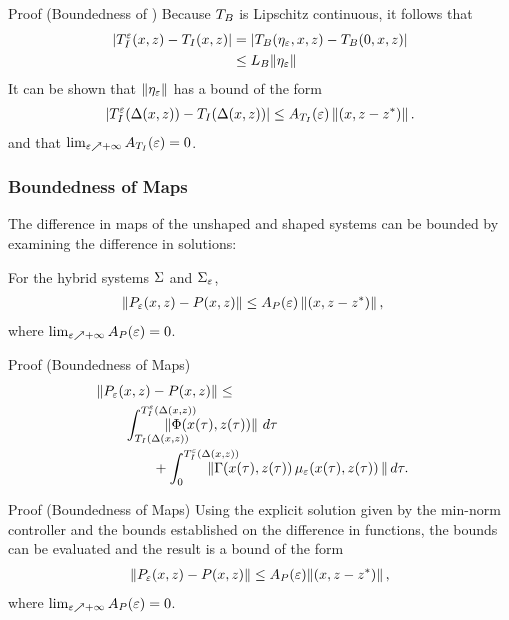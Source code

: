 \begin{frame}[t]
   {
    \begin{block}{Proof (Boundedness of \TtI{})}
      Because $T_{B}$ is Lipschitz continuous, it follows that
      \begin{align*}
        | T_{I}^{\varepsilon}(x, z) - T_{I}(x, z) | &= | T_{B}(\eta_{\varepsilon}, x, z) - T_{B}(0, x, z)|\\
        &\leq L_{B} \| \eta_{\varepsilon} \|
      \end{align*}
      It can be shown that $\| \eta_{\varepsilon} \|$ has a bound of the form
      \begin{align*}
        | T_{I}^{\varepsilon}(\Delta(x, z)) - T_{I}(\Delta(x, z)) | \leq A_{T_{I}}(\varepsilon) \left\|(x, z - z^{*})\right\|.
      \end{align*}
       and that $\lim_{\varepsilon \nearrow +\infty} A_{T_{I}}(\varepsilon) = 0$. \hfill \qedsymbol
    \end{block}
  }
\end{frame}

\begin{frame}[t]
  \frametitle{Boundedness of \Poincare{} Maps}
   {
    The difference in \Poincare{} maps of the unshaped and shaped systems can be
    bounded by examining the difference in solutions:
    \begin{lemma}
      For the hybrid systems $\Sigma$ and $\Sigma_{\varepsilon}$,
      \begin{eqnarray}
        \nonumber
        &\| P_{\varepsilon}(x, z) - P(x, z) \| \leq A_{P}(\varepsilon) \left\|(x, z - z^{*})\right\|,
      \end{eqnarray}
      where  $\lim_{\varepsilon \nearrow +\infty}A_{P}(\varepsilon) = 0$.
    \end{lemma}
  }

   {
    \begin{block}{Proof (Boundedness of \Poincare{} Maps)}
      \begin{align*}
        \lefteqn{\left\| \Pe\argsxz - \P\argsxz \right\| \leq}\\
        & \hspace{2em} \int_{\TIDelta}^{\TIeDelta} \hspace{-2.5em} \left\| \bigF\argsxztau \right\| \, d\tau\\
        & \hspace{4em} \mbox{} + \int_{0}^{\TIeDelta} \hspace{-2.5em} \left\| \bigG\argsxztau \, \mueps\argsxztau \, \right\| d\tau.
      \end{align*}
    \end{block}
  }

   {
    \begin{block}{Proof (Boundedness of \Poincare{} Maps)}
      Using the explicit solution given by the min-norm controller and the bounds
      established on the difference in \tti{} functions, the bounds can be
      evaluated and the result is a bound of the form
      \begin{align*}
        \left\| P_{\varepsilon}(x, z) - P(x, z) \right\| \leq A_{P}(\varepsilon) \! \left\|(x, z - z^{*})\right\|,
      \end{align*}
      where  $\lim_{\varepsilon \nearrow +\infty}A_{P}(\varepsilon) = 0$. \hfill \qedsymbol
    \end{block}
  }
\end{frame}


